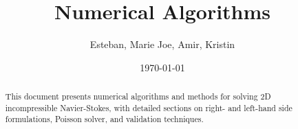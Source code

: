 \documentclass[11pt]{article}
\title{\textbf{Numerical Algorithms}}
\author{Esteban, Marie Joe, Amir, Kristin}
\date{\today}
\theoremstyle{plain}
\theoremstyle{definition}
\theoremstyle{remark}
\begin{document}
\maketitle
\begin{abstract}
This document presents numerical algorithms and methods for solving 2D incompressible Navier-Stokes, with detailed sections on right- and left-hand side formulations, Poisson solver, and validation techniques.
\end{abstract}











% 
\end{document}
